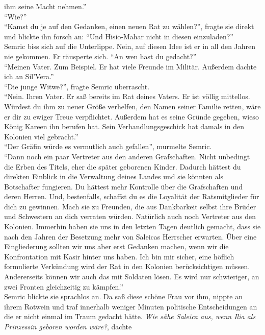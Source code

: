 ihm seine Macht nehmen.''\\
``Wie?''\\
``Kamst du je auf den Gedanken, einen neuen Rat zu wählen?'', fragte sie direkt und blickte ihn 
forsch an: ``Und Hisio-Mahar nicht in diesen einzuladen?''\\
Semric biss sich auf die Unterlippe. Nein, auf diesen Idee ist er in all den Jahren nie gekommen. 
Er räusperte sich. ``An wen hast du gedacht?''\\
``Meinen Vater. Zum Beispiel. Er hat viele Freunde im Militär. Außerdem dachte ich an Sil'Vera.''\\
``Die junge Witwe?'', fragte Semric überrascht.\\
``Nein. Ihren Vater. Er saß bereits im Rat deines Vaters. Er ist völlig mittellos. Würdest du ihm 
zu neuer Größe verhelfen, den Namen seiner Familie retten, wäre er dir zu ewiger Treue 
verpflichtet. Außerdem hat es seine Gründe gegeben, wieso König Kareen ihn berufen hat. Sein 
Verhandlungsgeschick hat damals in den Kolonien viel gebracht.''\\
``Der Gräfin würde es vermutlich auch gefallen'', murmelte Semric.\\
``Dann noch ein paar Vertreter aus den anderen Grafschaften. Nicht unbedingt die Erben des Titels, 
eher die später geborenen Kinder. Dadurch hättest du direkten Einblick in die Verwaltung deines 
Landes und sie könnten als Botschafter fungieren. Du hättest mehr Kontrolle über die Grafschaften 
und deren Herren. Und, bestenfalls, schaffst du es die Loyalität der Ratsmitglieder für dich zu 
gewinnen. Mach sie zu Freunden, die aus Dankbarkeit selbst ihre Brüder und Schwestern an dich 
verraten würden. Natürlich auch noch Vertreter aus den Kolonien. Immerhin haben sie uns in den 
letzten Tagen deutlich gemacht, dass sie nach den Jahren der Besetzung mehr von Saleicas 
Herrscher erwarten. Über eine Eingliederung sollten wir uns aber erst Gedanken machen, wenn wir 
die Konfrontation mit Kasir hinter uns haben. Ich bin mir sicher, eine höflich formulierte 
Verkündung wird der Rat in den Kolonien berücksichtigen müssen. Andererseits können wir auch das 
mit Soldaten lösen. Es wird nur schwieriger, an zwei Fronten gleichzeitig zu kämpfen.''\\
Semric blickte sie sprachlos an. Da saß diese schöne Frau vor ihm, nippte an ihrem Rotwein 
und traf innerhalb weniger Minuten politische Entscheidungen an die er nicht einmal im Traum 
gedacht hätte. \textit{Wie sähe Saleica aus, wenn Ilia als Prinzessin geboren worden wäre?}, dachte 
